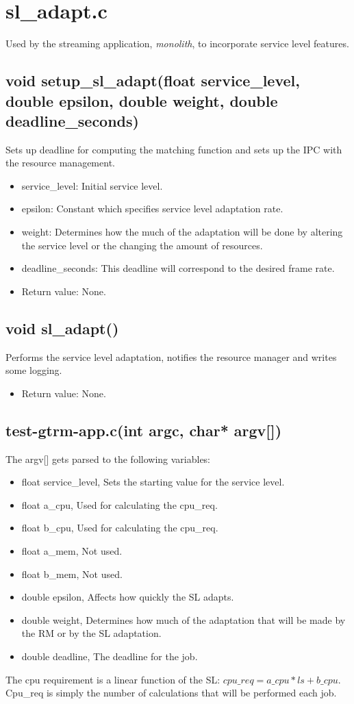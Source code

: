 \documentclass[nobiblatex]{LTHthesis}
\begin{document}
\section{sl\_adapt.c}
Used by the streaming application, \emph{monolith}, to incorporate service level features.
\subsection{void setup\_sl\_adapt(float service\_level, double epsilon, double weight, double deadline\_seconds)}
Sets up deadline for computing the matching function and sets up the IPC with the resource management.
\begin{itemize}
\item service\_level: Initial service level.
\item epsilon: Constant which specifies service level adaptation rate.
\item weight: Determines how the much of the adaptation will be done by altering the service level or the changing the amount of resources.
\item deadline\_seconds: This deadline will correspond to the desired frame rate.
\item Return value: None.
\end{itemize}

\subsection{void sl\_adapt()}
Performs the service level adaptation, notifies the resource manager and writes some logging.
\begin{itemize}
\item Return value: None.
\end{itemize}


\subsection{test-gtrm-app.c(int argc, char* argv[])}
The argv[] gets parsed to the following variables:
\begin{itemize}
		\item float service\_level, Sets the starting value for the service level.
		\item float a\_cpu, Used for calculating the cpu\_req.
		\item float b\_cpu, Used for calculating the cpu\_req.
		\item float a\_mem, Not used.
		\item float b\_mem, Not used.
		\item double epsilon, Affects how quickly the SL adapts.
		\item double weight, Determines how much of the adaptation that will be made by the RM or by the SL adaptation.
		\item double deadline, The deadline for the job.

\end{itemize}
The cpu requirement is a linear function of the SL: $cpu\_req = a\_cpu*ls +b\_cpu  $. Cpu\_req is simply the number of calculations 
that will be performed each job. 
\end{document}

